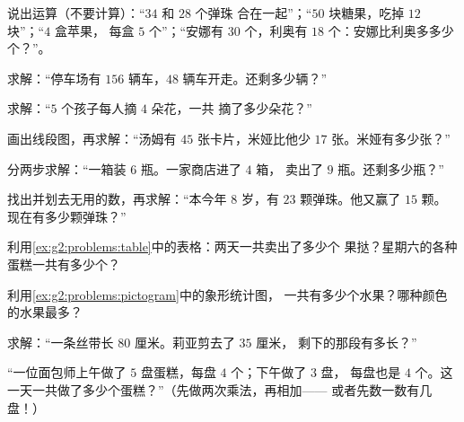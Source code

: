 \begin{exercise}[$\star$]\label{exo:g2:problems:1}
说出运算（不要计算）：“$34$ 和 $28$ 个弹珠
合在一起”；“$50$ 块糖果，吃掉 $12$ 块”；“$4$ 盒苹果，
每盒 $5$ 个”；“安娜有 $30$ 个，利奥有 $18$ 个：安娜比利奥多多少个？”。
\end{exercise}

\begin{exercise}[$\star$]\label{exo:g2:problems:2}
求解：“停车场有 $156$ 辆车，$48$ 辆车开走。还剩多少辆？”
\end{exercise}

\begin{exercise}[$\star$]\label{exo:g2:problems:3}
求解：“$5$ 个孩子每人摘 $4$ 朵花，一共
摘了多少朵花？”
\end{exercise}

\begin{exercise}[$\star$]\label{exo:g2:problems:4}
画出线段图，再求解：“汤姆有 $45$ 张卡片，米娅比他少 $17$
张。米娅有多少张？”
\end{exercise}

\begin{exercise}[$\star$]\label{exo:g2:problems:5}
分两步求解：“一箱装 $6$ 瓶。一家商店进了 $4$ 箱，
卖出了 $9$ 瓶。还剩多少瓶？”
\end{exercise}

\begin{exercise}[$\star$]\label{exo:g2:problems:6}
找出并划去无用的数，再求解：“本今年 $8$
岁，有 $23$ 颗弹珠。他又赢了 $15$ 颗。
现在有多少颗弹珠？”
\end{exercise}

\begin{exercise}[$\star$]\label{exo:g2:problems:7}
利用\cref{ex:g2:problems:table}中的表格：两天一共卖出了多少个
果挞？星期六的各种蛋糕一共有多少个？
\end{exercise}

\begin{exercise}[$\star$]\label{exo:g2:problems:8}
利用\cref{ex:g2:problems:pictogram}中的象形统计图，
一共有多少个水果？哪种颜色的水果最多？
\end{exercise}

\begin{exercise}[$\star$]\label{exo:g2:problems:9}
求解：“一条丝带长 $80$ 厘米。莉亚剪去了 $35$ 厘米，
剩下的那段有多长？”
\end{exercise}

\begin{exercise}[$\star\star$]\label{exo:g2:problems:10}
“一位面包师上午做了 $5$ 盘蛋糕，每盘 $4$ 个；下午做了 $3$ 盘，
每盘也是 $4$ 个。这一天一共做了多少个蛋糕？”（先做两次乘法，再相加——
或者先数一数有几盘！）
\end{exercise}
